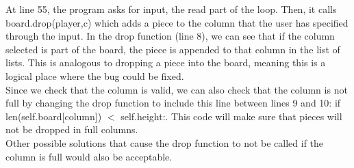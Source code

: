 At line 55, the program asks for input, the read part of the loop.
Then, it calls board.drop(player,c) which adds a piece to the column that the user has specified through the input.
In the drop function (line 8), we can see that if the column selected is part of the board,
	the piece is appended to that column in the list of lists.
This is analogous to dropping a piece into the board, meaning this is a logical place where the bug could be fixed.\\

Since we check that the column is valid,
we can also check that the column is not full by changing the drop function to include this line between lines 9 and 10:
if len(self.board[column]) $<$ self.height:.
This code will make sure that pieces will not be dropped in full columns.\\

Other possible solutions that cause the drop function to not be called if the column is full would also be acceptable.

\newpage